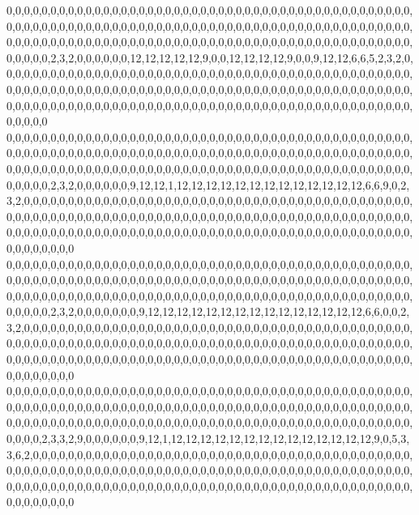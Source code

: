 0,0,0,0,0,0,0,0,0,0,0,0,0,0,0,0,0,0,0,0,0,0,0,0,0,0,0,0,0,0,0,0,0,0,0,0,0,0,0,0,0,0,0,0,0,0,0,0,0,0,0,0,0,0,0,0,0,0,0,0,0,0,0,0,0,0,0,0,0,0,0,0,0,0,0,0,0,0,0,0,0,0,0,0,0,0,0,0,0,0,0,0,0,0,0,0,0,0,0,0,0,0,0,0,0,0,0,0,0,0,0,0,0,0,0,0,0,0,0,0,0,0,0,0,0,0,0,0,0,0,0,0,0,0,0,0,0,0,0,0,0,0,0,2,3,2,0,0,0,0,0,0,12,12,12,12,12,9,0,0,12,12,12,12,9,0,0,9,12,12,6,6,5,2,3,2,0,0,0,0,0,0,0,0,0,0,0,0,0,0,0,0,0,0,0,0,0,0,0,0,0,0,0,0,0,0,0,0,0,0,0,0,0,0,0,0,0,0,0,0,0,0,0,0,0,0,0,0,0,0,0,0,0,0,0,0,0,0,0,0,0,0,0,0,0,0,0,0,0,0,0,0,0,0,0,0,0,0,0,0,0,0,0,0,0,0,0,0,0,0,0,0,0,0,0,0,0,0,0,0,0,0,0,0,0,0,0,0,0,0,0,0,0,0,0,0,0,0,0,0,0,0,0,0,0,0,0,0,0,0,0,0,0,0,0,0,0,0,0,0
0,0,0,0,0,0,0,0,0,0,0,0,0,0,0,0,0,0,0,0,0,0,0,0,0,0,0,0,0,0,0,0,0,0,0,0,0,0,0,0,0,0,0,0,0,0,0,0,0,0,0,0,0,0,0,0,0,0,0,0,0,0,0,0,0,0,0,0,0,0,0,0,0,0,0,0,0,0,0,0,0,0,0,0,0,0,0,0,0,0,0,0,0,0,0,0,0,0,0,0,0,0,0,0,0,0,0,0,0,0,0,0,0,0,0,0,0,0,0,0,0,0,0,0,0,0,0,0,0,0,0,0,0,0,0,0,0,0,0,0,0,0,0,2,3,2,0,0,0,0,0,0,9,12,12,1,12,12,12,12,12,12,12,12,12,12,12,12,12,6,6,9,0,2,3,2,0,0,0,0,0,0,0,0,0,0,0,0,0,0,0,0,0,0,0,0,0,0,0,0,0,0,0,0,0,0,0,0,0,0,0,0,0,0,0,0,0,0,0,0,0,0,0,0,0,0,0,0,0,0,0,0,0,0,0,0,0,0,0,0,0,0,0,0,0,0,0,0,0,0,0,0,0,0,0,0,0,0,0,0,0,0,0,0,0,0,0,0,0,0,0,0,0,0,0,0,0,0,0,0,0,0,0,0,0,0,0,0,0,0,0,0,0,0,0,0,0,0,0,0,0,0,0,0,0,0,0,0,0,0,0,0,0,0,0,0,0,0,0,0
0,0,0,0,0,0,0,0,0,0,0,0,0,0,0,0,0,0,0,0,0,0,0,0,0,0,0,0,0,0,0,0,0,0,0,0,0,0,0,0,0,0,0,0,0,0,0,0,0,0,0,0,0,0,0,0,0,0,0,0,0,0,0,0,0,0,0,0,0,0,0,0,0,0,0,0,0,0,0,0,0,0,0,0,0,0,0,0,0,0,0,0,0,0,0,0,0,0,0,0,0,0,0,0,0,0,0,0,0,0,0,0,0,0,0,0,0,0,0,0,0,0,0,0,0,0,0,0,0,0,0,0,0,0,0,0,0,0,0,0,0,0,0,2,3,2,0,0,0,0,0,0,0,9,12,12,12,12,12,12,12,12,12,12,12,12,12,12,12,6,6,0,0,2,3,2,0,0,0,0,0,0,0,0,0,0,0,0,0,0,0,0,0,0,0,0,0,0,0,0,0,0,0,0,0,0,0,0,0,0,0,0,0,0,0,0,0,0,0,0,0,0,0,0,0,0,0,0,0,0,0,0,0,0,0,0,0,0,0,0,0,0,0,0,0,0,0,0,0,0,0,0,0,0,0,0,0,0,0,0,0,0,0,0,0,0,0,0,0,0,0,0,0,0,0,0,0,0,0,0,0,0,0,0,0,0,0,0,0,0,0,0,0,0,0,0,0,0,0,0,0,0,0,0,0,0,0,0,0,0,0,0,0,0,0,0,0,0,0,0
0,0,0,0,0,0,0,0,0,0,0,0,0,0,0,0,0,0,0,0,0,0,0,0,0,0,0,0,0,0,0,0,0,0,0,0,0,0,0,0,0,0,0,0,0,0,0,0,0,0,0,0,0,0,0,0,0,0,0,0,0,0,0,0,0,0,0,0,0,0,0,0,0,0,0,0,0,0,0,0,0,0,0,0,0,0,0,0,0,0,0,0,0,0,0,0,0,0,0,0,0,0,0,0,0,0,0,0,0,0,0,0,0,0,0,0,0,0,0,0,0,0,0,0,0,0,0,0,0,0,0,0,0,0,0,0,0,0,0,0,0,0,2,3,3,2,9,0,0,0,0,0,0,9,12,1,12,12,12,12,12,12,12,12,12,12,12,12,12,12,9,0,5,3,3,6,2,0,0,0,0,0,0,0,0,0,0,0,0,0,0,0,0,0,0,0,0,0,0,0,0,0,0,0,0,0,0,0,0,0,0,0,0,0,0,0,0,0,0,0,0,0,0,0,0,0,0,0,0,0,0,0,0,0,0,0,0,0,0,0,0,0,0,0,0,0,0,0,0,0,0,0,0,0,0,0,0,0,0,0,0,0,0,0,0,0,0,0,0,0,0,0,0,0,0,0,0,0,0,0,0,0,0,0,0,0,0,0,0,0,0,0,0,0,0,0,0,0,0,0,0,0,0,0,0,0,0,0,0,0,0,0,0,0,0,0,0,0,0,0

